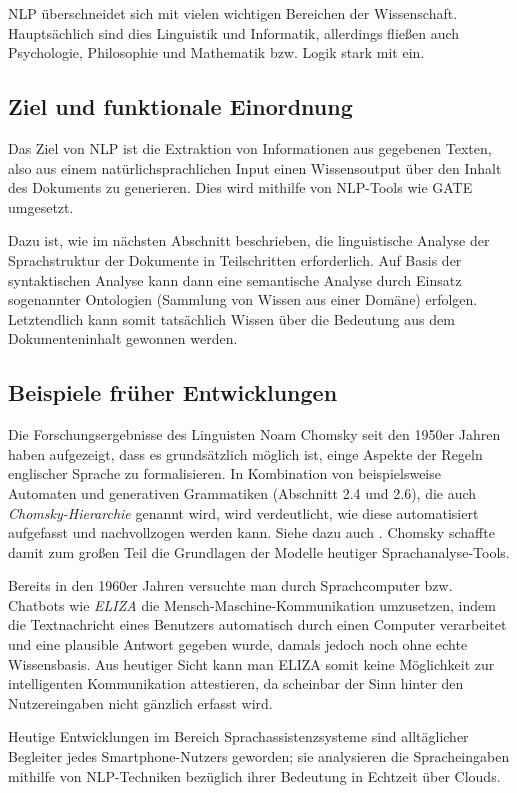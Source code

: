 \documentclass[12pt]{report}
\begin{document}
NLP überschneidet sich mit vielen wichtigen Bereichen der Wissenschaft. Hauptsächlich sind dies Linguistik und Informatik, allerdings fließen auch Psychologie, Philosophie und Mathematik bzw. Logik stark mit ein. 

\subsection{Ziel und funktionale Einordnung}
Das Ziel von NLP ist die Extraktion von Informationen aus gegebenen Texten, also aus einem natürlichsprachlichen Input einen Wissensoutput über den Inhalt des Dokuments zu generieren. Dies wird mithilfe von NLP-Tools wie GATE umgesetzt.

Dazu ist, wie im nächsten Abschnitt beschrieben, die linguistische Analyse der Sprachstruktur der Dokumente in Teilschritten erforderlich. Auf Basis der syntaktischen Analyse kann dann eine semantische Analyse durch Einsatz sogenannter Ontologien (Sammlung von Wissen aus einer Domäne) erfolgen. Letztendlich kann somit tatsächlich Wissen über die Bedeutung aus dem Dokumenteninhalt gewonnen werden.

\subsection{Beispiele früher Entwicklungen}
Die Forschungsergebnisse des Linguisten Noam Chomsky seit den 1950er Jahren haben aufgezeigt, dass es grundsätzlich möglich ist, einge Aspekte der Regeln englischer Sprache zu formalisieren. In Kombination von beispielsweise Automaten und generativen Grammatiken (Abschnitt 2.4 und 2.6), die auch \textit{Chomsky-Hierarchie} genannt wird, wird verdeutlicht, wie diese automatisiert aufgefasst und nachvollzogen werden kann. Siehe dazu auch \cite{cho57}. Chomsky schaffte damit zum großen Teil die Grundlagen der Modelle heutiger Sprachanalyse-Tools.

Bereits in den 1960er Jahren versuchte man durch Sprachcomputer bzw. Chatbots wie \textit{ELIZA} \cite{wei66} die Mensch-Maschine-Kommunikation umzusetzen, indem die Textnachricht eines Benutzers automatisch durch einen Computer verarbeitet und eine plausible Antwort gegeben wurde, damals jedoch noch ohne echte Wissensbasis. Aus heutiger Sicht kann man ELIZA somit keine Möglichkeit zur \glqq   intelligenten\grqq{} Kommunikation attestieren, da scheinbar der Sinn hinter den Nutzereingaben nicht gänzlich erfasst wird.

Heutige Entwicklungen im Bereich Sprachassistenzsysteme sind alltäglicher Begleiter jedes Smartphone-Nutzers geworden; sie analysieren die Spracheingaben mithilfe von NLP-Techniken bezüglich ihrer Bedeutung in Echtzeit über Clouds. \cite{hao14}
\end{document}
